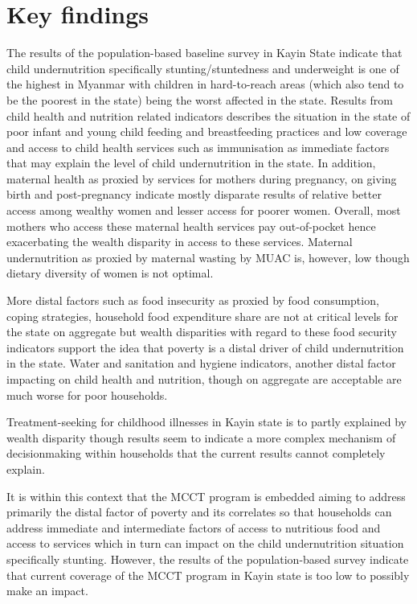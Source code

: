 \documentclass[12pt,a4paper]{article}
\begin{document}
\hypertarget{findings}{%
\section{Key findings}\label{findings}}

The results of the population-based baseline survey in Kayin State indicate that child undernutrition specifically stunting/stuntedness and underweight is one of the highest in Myanmar with children in hard-to-reach areas (which also tend to be the poorest in the state) being the worst affected in the state. Results from child health and nutrition related indicators describes the situation in the state of poor infant and young child feeding and breastfeeding practices and low coverage and access to child health services such as immunisation as immediate factors that may explain the level of child undernutrition in the state. In addition, maternal health as proxied by services for mothers during pregnancy, on giving birth and post-pregnancy indicate mostly disparate results of relative better access among wealthy women and lesser access for poorer women. Overall, most mothers who access these maternal health services pay out-of-pocket hence exacerbating the wealth disparity in access to these services. Maternal undernutrition as proxied by maternal wasting by MUAC is, however, low though dietary diversity of women is not optimal.

More distal factors such as food insecurity as proxied by food consumption, coping strategies, household food expenditure share are not at critical levels for the state on aggregate but wealth disparities with regard to these food security indicators support the idea that poverty is a distal driver of child undernutrition in the state. Water and sanitation and hygiene indicators, another distal factor impacting on child health and nutrition, though on aggregate are acceptable are much worse for poor households.

Treatment-seeking for childhood illnesses in Kayin state is to partly explained by wealth disparity though results seem to indicate a more complex mechanism of decisionmaking within households that the current results cannot completely explain.

It is within this context that the MCCT program is embedded aiming to address primarily the distal factor of poverty and its correlates so that households can address immediate and intermediate factors of access to nutritious food and access to services which in turn can impact on the child undernutrition situation specifically stunting. However, the results of the population-based survey indicate that current coverage of the MCCT program in Kayin state is too low to possibly make an impact.
\end{document}
